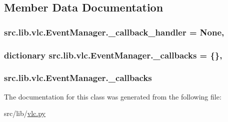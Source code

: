 \subsection{Member Data Documentation}
\hypertarget{classsrc_1_1lib_1_1vlc_1_1EventManager_ad477af10daa2903a52bc0f142fca198d}{}
\subsubsection[{\+\_\+callback\+\_\+handler}]{\setlength{\rightskip}{0pt plus 5cm}src.\+lib.\+vlc.\+Event\+Manager.\+\_\+callback\+\_\+handler = None\hspace{0.3cm}{\ttfamily [static]}, {\ttfamily [private]}}\label{classsrc_1_1lib_1_1vlc_1_1EventManager_ad477af10daa2903a52bc0f142fca198d}
\hypertarget{classsrc_1_1lib_1_1vlc_1_1EventManager_a3cbe5bf81d4bf18946cf50aa1383766c}{}
\subsubsection[{\+\_\+callbacks}]{\setlength{\rightskip}{0pt plus 5cm}dictionary src.\+lib.\+vlc.\+Event\+Manager.\+\_\+callbacks = \{\}\hspace{0.3cm}{\ttfamily [static]}, {\ttfamily [private]}}\label{classsrc_1_1lib_1_1vlc_1_1EventManager_a3cbe5bf81d4bf18946cf50aa1383766c}
\hypertarget{classsrc_1_1lib_1_1vlc_1_1EventManager_a50815d3eaa5da503c6a966ab9f2acce1}{}
\subsubsection[{\+\_\+callbacks}]{\setlength{\rightskip}{0pt plus 5cm}src.\+lib.\+vlc.\+Event\+Manager.\+\_\+callbacks\hspace{0.3cm}{\ttfamily [private]}}\label{classsrc_1_1lib_1_1vlc_1_1EventManager_a50815d3eaa5da503c6a966ab9f2acce1}


The documentation for this class was generated from the following file\+:\begin{DoxyCompactItemize}
\item 
src/lib/\hyperlink{vlc_8py}{vlc.\+py}\end{DoxyCompactItemize}
